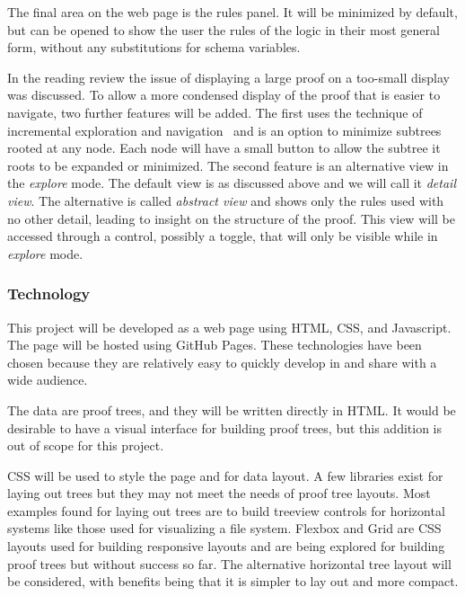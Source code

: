 \documentclass[12pt]{article}
\begin{document}
The final area on the web page is the rules panel. It will be minimized by default, but can be opened to show the user the rules of the logic in their most general form, without any substitutions for schema variables.

In the reading review the issue of displaying a large proof on a too-small display was discussed. To allow a more condensed display of the proof that is easier to navigate, two further features will be added. The first uses the technique of incremental exploration and navigation~\cite{graphvis-herman+melancon+marshall} and is an option to minimize subtrees rooted at any node. Each node will have a small button to allow the subtree it roots to be expanded or minimized. The second feature is an alternative view in the \textit{explore} mode. The default view is as discussed above and we will call it \textit{detail view}. The alternative is called \textit{abstract view} and shows only the rules used with no other detail, leading to insight on the structure of the proof. This view will be accessed through a control, possibly a toggle, that will only be visible while in \textit{explore} mode.

\subsubsection{Technology}


This project will be developed as a web page using HTML, CSS, and Javascript. The page will be hosted using GitHub Pages. These technologies have been chosen because they are relatively easy to quickly develop in and share with a wide audience.

The data are proof trees, and they will be written directly in HTML. It would be desirable to have a visual interface for building proof trees, but this addition is out of scope for this project.

CSS will be used to style the page and for data layout. A few libraries exist for laying out trees but they may not meet the needs of proof tree layouts. Most examples found for laying out trees are to build treeview controls for horizontal systems like those used for visualizing a file system. Flexbox and Grid are CSS layouts used for building responsive layouts and are being explored for building proof trees but without success so far. The alternative horizontal tree layout will be considered, with benefits being that it is simpler to lay out and more compact.
\end{document}
